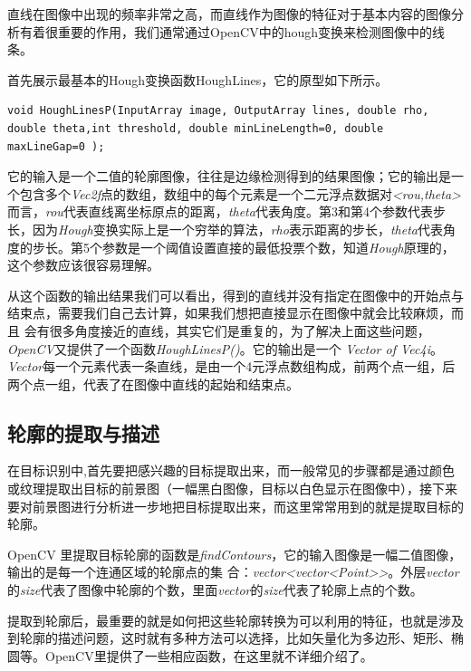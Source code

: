 \documentclass{XDBAthesis}
\begin{document}
直线在图像中出现的频率非常之高，而直线作为图像的特征对于基本内容的图像分析有着很重要的作用，我们通常通过OpenCV中的hough变换来检测图像中的线条。

首先展示最基本的Hough变换函数HoughLines，它的原型如下所示。
\begin{lstlisting}
void HoughLinesP(InputArray image, OutputArray lines, double rho, double theta,int threshold, double minLineLength=0, double maxLineGap=0 ); 
\end{lstlisting}

 

    它的输入是一个二值的轮廓图像，往往是边缘检测得到的结果图像；它的输出是一个包含多个\emph{Vec2f}点的数组，数组中的每个元素是一个二元浮点数据对\emph{<rou,theta>}而言，\emph{rou}代表直线离坐标原点的距离，\emph{theta}代表角度。第3和第4个参数代表步长，因为\emph{Hough}变换实际上是一个穷举的算法，\emph{rho}表示距离的步长，\emph{theta}代表角度的步长。第5个参数是一个阈值设置直接的最低投票个数，知道\emph{Hough}原理的，这个参数应该很容易理解。

   从这个函数的输出结果我们可以看出，得到的直线并没有指定在图像中的开始点与结束点，需要我们自己去计算，如果我们想把直接显示在图像中就会比较麻烦，而且 会有很多角度接近的直线，其实它们是重复的，为了解决上面这些问题，\emph{OpenCV}又提供了一个函数\emph{HoughLinesP()}。它的输出是一个 \emph{Vector of Vec4i}。\emph{Vector}每一个元素代表一条直线，是由一个4元浮点数组构成，前两个点一组，后两个点一组，代表了在图像中直线的起始和结束点。

\subsection{轮廓的提取与描述}

在目标识别中,首先要把感兴趣的目标提取出来，而一般常见的步骤都是通过颜色或纹理提取出目标的前景图（一幅黑白图像，目标以白色显示在图像中），接下来要对前景图进行分析进一步地把目标提取出来，而这里常常用到的就是提取目标的轮廓。

OpenCV 里提取目标轮廓的函数是\emph{findContours}，它的输入图像是一幅二值图像，输出的是每一个连通区域的轮廓点的集 合：\emph{vector<vector<Point>>}。外层\emph{vector}的\emph{size}代表了图像中轮廓的个数，里面\emph{vector}的\emph{size}代表了轮廓上点的个数。

提取到轮廓后，最重要的就是如何把这些轮廓转换为可以利用的特征，也就是涉及到轮廓的描述问题，这时就有多种方法可以选择，比如矢量化为多边形、矩形、椭圆等。OpenCV里提供了一些相应函数，在这里就不详细介绍了。  


\ifx\allfiles\undefined
%

\end{document}
